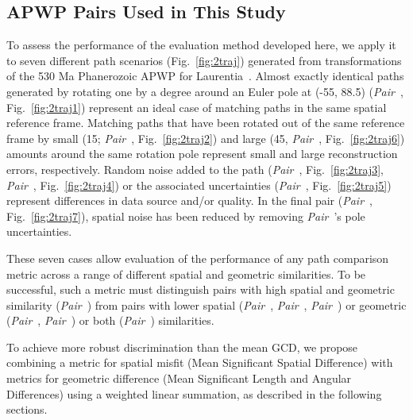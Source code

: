 \subsection{APWP Pairs Used in This Study}

To assess the performance of the evaluation method developed here, we apply it
to seven different path scenarios (Fig.~\ref{fig:2traj}) generated from
transformations of the 530 Ma Phanerozoic APWP for
Laurentia~\citep{T12}. Almost exactly identical paths generated by rotating one
by a degree around an Euler pole at (-55\degree, 88.5\degree)
(\emph{Pair}~\textbf{}, Fig.~\ref{fig:2traj1}) represent an
ideal case of matching paths in the same spatial reference frame. Matching paths
that have been rotated out of the same reference frame by small (15\degree;
\emph{Pair}~\textbf{}, Fig.~\ref{fig:2traj2}) and large
(45\degree, \emph{Pair}~\textbf{}, Fig.~\ref{fig:2traj6})
amounts around the same rotation pole represent small and large reconstruction
errors, respectively. Random noise added to the path
(\emph{Pair}~\textbf{}, Fig.~\ref{fig:2traj3},
\emph{Pair}~\textbf{}, Fig.~\ref{fig:2traj4}) or the
associated uncertainties (\emph{Pair}~\textbf{},
Fig.~\ref{fig:2traj5}) represent differences in data source and/or quality. In
the final pair (\emph{Pair}~\textbf{},
Fig.~\ref{fig:2traj7}), spatial noise has been reduced by removing
\emph{Pair}~\textbf{}'s pole uncertainties.

These seven cases allow evaluation of the performance of any path comparison
metric across a range of different spatial and geometric similarities. To be
successful, such a metric must distinguish pairs with high spatial and geometric
similarity (\emph{Pair}~\textbf{}) from pairs with lower
spatial (\emph{Pair}~\textbf{},
\emph{Pair}~\textbf{},
\emph{Pair}~\textbf{})
or geometric (\emph{Pair}~\textbf{},
\emph{Pair}~\textbf{}) or both
(\emph{Pair}~\textbf{}) similarities.

To achieve more robust discrimination than the mean GCD, we propose combining a
metric for spatial misfit (Mean Significant Spatial Difference) with metrics for
geometric difference (Mean Significant Length and Angular Differences) using a
weighted linear summation, as described in the following sections.

